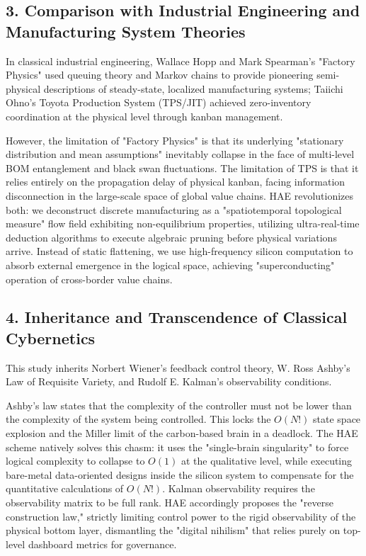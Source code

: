 \documentclass[11pt,a4paper]{article}
\begin{document}
\subsection*{3. Comparison with Industrial Engineering and Manufacturing System Theories}
In classical industrial engineering, Wallace Hopp and Mark Spearman's "Factory Physics" used queuing theory and Markov chains to provide pioneering semi-physical descriptions of steady-state, localized manufacturing systems; Taiichi Ohno's Toyota Production System (TPS/JIT) achieved zero-inventory coordination at the physical level through kanban management.

However, the limitation of "Factory Physics" is that its underlying "stationary distribution and mean assumptions" inevitably collapse in the face of multi-level BOM entanglement and black swan fluctuations. The limitation of TPS is that it relies entirely on the propagation delay of physical kanban, facing information disconnection in the large-scale space of global value chains. HAE revolutionizes both: we deconstruct discrete manufacturing as a "spatiotemporal topological measure" flow field exhibiting non-equilibrium properties, utilizing ultra-real-time deduction algorithms to execute algebraic pruning before physical variations arrive. Instead of static flattening, we use high-frequency silicon computation to absorb external emergence in the logical space, achieving "superconducting" operation of cross-border value chains.

\subsection*{4. Inheritance and Transcendence of Classical Cybernetics}
This study inherits Norbert Wiener's feedback control theory, W. Ross Ashby's Law of Requisite Variety, and Rudolf E. Kalman's observability conditions.

Ashby's law states that the complexity of the controller must not be lower than the complexity of the system being controlled. This locks the $O(N!)$ state space explosion and the Miller limit of the carbon-based brain in a deadlock. The HAE scheme natively solves this chasm: it uses the "single-brain singularity" to force logical complexity to collapse to $O(1)$ at the qualitative level, while executing bare-metal data-oriented designs inside the silicon system to compensate for the quantitative calculations of $O(N!)$. Kalman observability requires the observability matrix to be full rank. HAE accordingly proposes the "reverse construction law," strictly limiting control power to the rigid observability of the physical bottom layer, dismantling the "digital nihilism" that relies purely on top-level dashboard metrics for governance.
\end{document}
